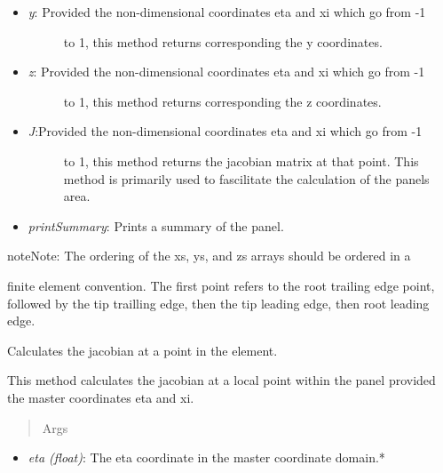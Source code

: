 \documentclass[letterpaper,10pt,english]{sphinxmanual}
\begin{document}
\begin{fulllineitems}
\begin{itemize}
\begin{description}
\end{description}

\item {} \begin{description}
\item[{\emph{y}: Provided the non-dimensional coordinates eta and xi which go from -1}] \leavevmode
to 1, this method returns corresponding the y coordinates.

\end{description}

\item {} \begin{description}
\item[{\emph{z}: Provided the non-dimensional coordinates eta and xi which go from -1}] \leavevmode
to 1, this method returns corresponding the z coordinates.

\end{description}

\item {} \begin{description}
\item[{\emph{J}:Provided the non-dimensional coordinates eta and xi which go from -1}] \leavevmode
to 1, this method returns the jacobian matrix at that point. This
method is primarily used to fascilitate the calculation of the panels
area.

\end{description}

\item {} 
\emph{printSummary}: Prints a summary of the panel.

\end{itemize}

\begin{notice}{note}{Note:}
The ordering of the xs, ys, and zs arrays should be ordered in a
\end{notice}

finite element convention. The first point refers to the root trailing edge
point, followed by the tip trailling edge, then the tip leading edge, then
root leading edge.

\begin{fulllineitems}
\label{aerodynamics:AeroComBAT.Aerodynamics.CQUADA.J}
Calculates the jacobian at a point in the element.

This method calculates the jacobian at a local point within the panel
provided the master coordinates eta and xi.
\begin{quote}\begin{description}
\item[{Args}] \leavevmode
\end{description}\end{quote}
\begin{itemize}
\item {} 
\emph{eta (float)}: The eta coordinate in the master coordinate domain.*


\end{itemize}
\end{fulllineitems}
\end{fulllineitems}
\end{document}
